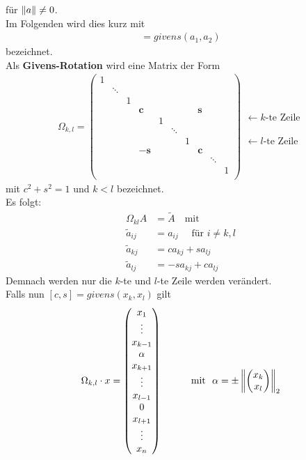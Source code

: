 für $\nn[a]\neq 0$.\\
Im Folgenden wird dies kurz mit
\begin{gather*}
  [c,s] = givens(a_1, a_2)
\end{gather*}
bezeichnet. \\
Als \textbf{Givens-Rotation} wird eine Matrix der Form
\begin{gather}
  \Omega _{k,l} = \begin{pmatrix}
    1 &&&&&&&&& \\
    & \ddots\\
    && 1\\
    &&& \mathbf{c} &&&& \mathbf{s} \\
    &&&& 1\\
    &&&&& \ddots \\
    &&&&&& 1\\
    &&& -\mathbf{s} &&&& \mathbf{c} \\
    &&&&&&&& \ddots \\
    &&&&&&&&& 1\\
  \end{pmatrix}
  \begin{array}{l}
    \\   \leftarrow \text{$k$-te Zeile}
    \\ \\ \\ \\ \leftarrow \text{$l$-te Zeile}
  \end{array}
  \label{IV.4.5}
\end{gather}
mit $c^2+s^2=1$ und $k<l$ bezeichnet.\\
Es folgt:
\begin{align*}
  \Omega_{kl} A &= \widetilde{A} \quad \text{mit} \\
  \widetilde{a}_{ij}  &= a_{ij} \quad \text{ für } i\neq k,l \\
  \widetilde{a}_{kj} & = ca_{kj}+sa_{lj} \\
  \widetilde{a}_{lj} & = -sa_{kj} + ca_{lj}
\end{align*}
Demnach werden nur die $k$-te und $l$-te Zeile werden verändert. \\
Falls nun $[c,s] = givens(x_k, x_l)$ gilt
\begin{gather}
  \Omega_{k,l}\cdot x = \begin{pmatrix}
    x_1 \\ \vdots \\x_{k-1} \\\alpha \\ x_{k+1}
    \\\vdots \\
    x_{l-1} \\ 0 \\x_{l+1} \\\vdots \\x_n
  \end{pmatrix}
  \qquad
  \quad \text{mit~~}
  \alpha = \pm \nn[  \begin{pmatrix} x_k \\ x_l\end{pmatrix}]_2
  \label{IV.4.6}
\end{gather}
